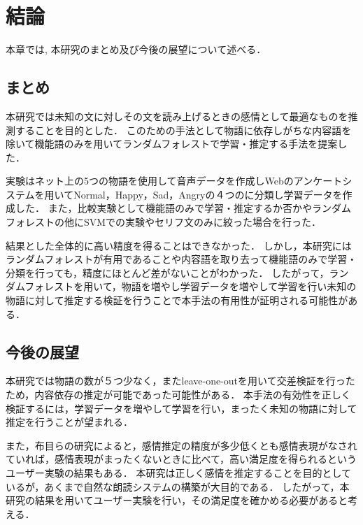 \chapter{結論}

本章では, 本研究のまとめ及び今後の展望について述べる．

\section{まとめ}
本研究では未知の文に対しその文を読み上げるときの感情として最適なものを推測することを目的とした．
このための手法として物語に依存しがちな内容語を除いて機能語のみを用いてランダムフォレストで学習・推定する手法を提案した．


実験はネット上の5つの物語を使用して音声データを作成しWebのアンケートシステムを用いてNormal，Happy，Sad，Angryの４つのに分類し学習データを作成した．
また，比較実験として機能語のみで学習・推定するか否かやランダムフォレストの他にSVMでの実験やセリフ文のみに絞った場合を行った．


結果とした全体的に高い精度を得ることはできなかった．
しかし，本研究にはランダムフォレストが有用であることや内容語を取り去って機能語のみで学習・分類を行っても，精度にほとんど差がないことがわかった．
したがって，ランダムフォレストを用いて，物語を増やし学習データを増やして学習を行い未知の物語に対して推定する検証を行うことで本手法の有用性が証明される可能性がある．

\section{今後の展望}
本研究では物語の数が５つ少なく，またleave-one-outを用いて交差検証を行ったため，内容依存の推定が可能であった可能性がある．
本手法の有効性を正しく検証するには，学習データを増やして学習を行い，まったく未知の物語に対して推定を行うことが望まれる．

また，布目ら\cite{fume}の研究によると，感情推定の精度が多少低くとも感情表現がなされていれば，感情表現がまったくないときに比べて，高い満足度を得られるというユーザー実験の結果もある．
本研究は正しく感情を推定することを目的としているが，あくまで自然な朗読システムの構築が大目的である．
したがって，本研究の結果を用いてユーザー実験を行い，その満足度を確かめる必要があると考える．


